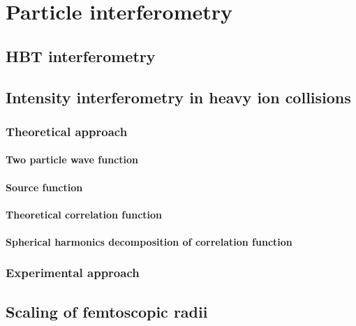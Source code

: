 \chapter{Particle interferometry}
  \section{HBT interferometry}
  \section{Intensity interferometry in heavy ion collisions}
    \subsection{Theoretical approach}
      \subsubsection{Two particle wave function}
      \subsubsection{Source function}
      \subsubsection{Theoretical correlation function}
      \subsubsection{Spherical harmonics decomposition of correlation function}
    \subsection{Experimental approach}
  \section{Scaling of femtoscopic radii}
